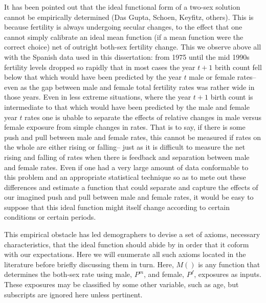  \FloatBarrier
It has been pointed out that the ideal functional form of a two-sex solution
cannot be empirically determined (Das Gupta, Schoen, Keyfitz, others). This is
because fertility is always undergoing secular changes, to the effect that
one cannot simply calibrate an ideal mean function (if a mean function were the
correct choice) net of outright both-sex fertility change. This we observe above
all with the Spanish data used in this dissertation: from 1975 until the mid
1990s fertility levels dropped so rapidly that in most cases the year $t+1$
brith count fell below that which would have been predicted by the year $t$
male or female rates-- even as the gap between male and
female total fertility rates was rather wide in those years. Even in less
extreme situations, where the year $t+1$ birth count is intermediate to that which would
have been predicted by the male and female year $t$ rates one is ubable to
separate the effects of relative changes in male versus female exposure from
simple changes in rates. That is to say, if there is some push and pull between
male and female rates, this cannot be measured if rates on the whole are either
rising or falling-- just as it is difficult to measure the net rising and
falling of rates when there is feedback and separation between male and female
rates. Even if one had a very large amount of data conformable to this problem
and an appropriate statistical technique so as to mete out these differences 
and estimate a function that could separate and capture the effects of our
imagined push and pull between male and female rates, it would be easy to 
suppose that this ideal function might itself change according to certain
conditions or certain periods.

This empirical obstacle has led demographers to devise a set of axioms,
necessary characteristics, that the ideal function should abide by in order that it coform with our
expectations. Here we will enumerate all such axioms located in the literature
before briefly discussing them in turn. Here, $M()$ is any function that
determines the both-sex rate using male, $P^m$, and female, $P^f$, exposures as
inputs. These exposures may be classified by some other variable, such as age, but
subscripts are ignored here unless pertinent.

